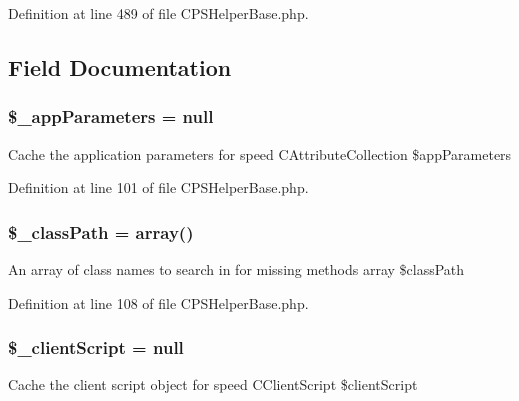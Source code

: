 Definition at line 489 of file CPSHelperBase.php.








\subsection{Field Documentation}
\hypertarget{classCPSHelperBase_ace966ab0b5f00686b49f86b4d4a664a2}{
\subsubsection[{\$\_\-appParameters}]{\setlength{\rightskip}{0pt plus 5cm}\$\_\-appParameters = null}}
\label{classCPSHelperBase_ace966ab0b5f00686b49f86b4d4a664a2}
Cache the application parameters for speed CAttributeCollection \$appParameters 

Definition at line 101 of file CPSHelperBase.php.

\hypertarget{classCPSHelperBase_a3f47ff234cfea41e28e030bbf75c56eb}{
\subsubsection[{\$\_\-classPath}]{\setlength{\rightskip}{0pt plus 5cm}\$\_\-classPath = {\bf array}()}}
\label{classCPSHelperBase_a3f47ff234cfea41e28e030bbf75c56eb}
An array of class names to search in for missing methods array \$classPath 

Definition at line 108 of file CPSHelperBase.php.

\hypertarget{classCPSHelperBase_a7e5fa1f4672a5a8a8ddb2d96bea86daa}{
\subsubsection[{\$\_\-clientScript}]{\setlength{\rightskip}{0pt plus 5cm}\$\_\-clientScript = null}}
\label{classCPSHelperBase_a7e5fa1f4672a5a8a8ddb2d96bea86daa}
Cache the client script object for speed CClientScript \$clientScript 

